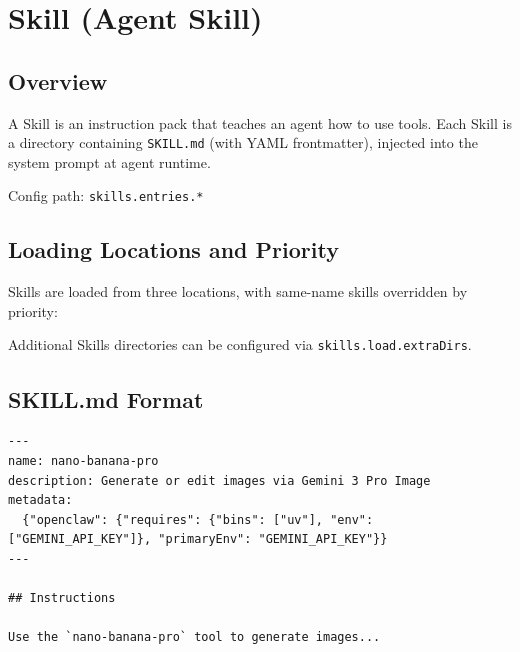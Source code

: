 \chapter{Skill (Agent Skill)}

\section{Overview}

A Skill is an instruction pack that teaches an agent how to use tools. Each Skill is a directory containing \texttt{SKILL.md} (with YAML frontmatter), injected into the system prompt at agent runtime.

Config path: \texttt{skills.entries.*}

\section{Loading Locations and Priority}

Skills are loaded from three locations, with same-name skills overridden by priority:

\begin{center}
\end{center}

Additional Skills directories can be configured via \texttt{skills.load.extraDirs}.

\section{SKILL.md Format}

\begin{lstlisting}
---
name: nano-banana-pro
description: Generate or edit images via Gemini 3 Pro Image
metadata:
  {"openclaw": {"requires": {"bins": ["uv"], "env": ["GEMINI_API_KEY"]}, "primaryEnv": "GEMINI_API_KEY"}}
---

## Instructions

Use the `nano-banana-pro` tool to generate images...
\end{lstlisting}

